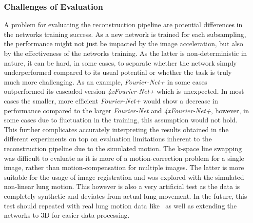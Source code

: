 \subsubsection{Challenges of Evaluation} \label{SubSubSec:ChallengesEvaluation}
A problem for evaluating the reconstruction pipeline are potential differences in the networks training success. As a new network is trained for each subsampling, the performance might not just be impacted by the image acceleration, but also by the effectiveness of the networks training. As the latter is non-deterministic in nature, it can be hard, in some cases, to separate whether the network simply underperformed compared to its usual potential or whether the task is truly much more challenging. As an example, \emph{Fourier-Net+} in some cases outperformed its cascaded version \emph{4xFourier-Net+} which is unexpected. In most cases the smaller, more efficient \emph{Fourier-Net+} would show a decrease in performance compared to the larger \emph{Fourier-Net} and \emph{4xFourier-Net+}, however, in some cases due to fluctuation in the training, this assumption would not hold. This further complicates accurately interpreting the results obtained in the different experiments on top on evaluation limitations inherent to the reconstruction pipeline due to the simulated motion. The k-space line swapping was difficult to evaluate as it is more of a motion-correction problem for a single image, rather than motion-compensation for multiple images. The latter is more suitable for the usage of image registration and was explored with the simulated non-linear lung motion. This however is also a very artificial test as the data is completely synthetic and deviates from actual lung movement. In the future, this test should repeated with real lung motion data like~\cite{DataLungMotoin} as well as extending the networks to 3D for easier data processing.
